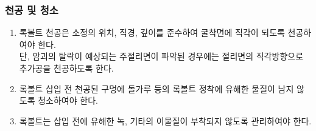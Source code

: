 \subsubsection{  천공 및 청소}
\begin{enumerate}
\item  록볼트 천공은 소정의 위치, 직경, 깊이를 준수하여 굴착면에 직각이 되도록 천공하여야 한다. 
       \\ 단, 암괴의 탈락이 예상되는 주절리면이 파악된 경우에는 절리면의 직각방향으로 추가공을 천공하도록 한다.  
\item  록볼트 삽입 전 천공된 구멍에 돌가루 등의 록볼트 정착에 유해한 물질이 남지 않도록 청소하여야 한다.  
\item  록볼트는 삽입 전에 유해한 녹, 기타의 이물질이 부착되지 않도록 관리하여야 한다.  
\end{enumerate}

